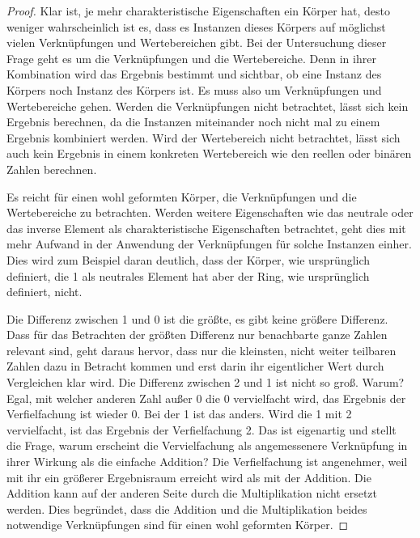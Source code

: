 \documentclass{report}
\numberwithin{equation}{section}
\begin{document}
\begin{proof}
	Klar ist, je mehr charakteristische Eigenschaften ein Körper hat, desto weniger wahrscheinlich ist es, dass es Instanzen dieses Körpers auf möglichst vielen Verknüpfungen und Wertebereichen gibt. Bei der Untersuchung dieser Frage geht es um die Verknüpfungen und die Wertebereiche. Denn in ihrer Kombination wird das Ergebnis bestimmt und sichtbar, ob eine Instanz des Körpers noch Instanz des Körpers ist. Es muss also um Verknüpfungen und Wertebereiche gehen. Werden die Verknüpfungen nicht betrachtet, lässt sich kein Ergebnis berechnen, da die Instanzen miteinander noch nicht mal zu einem Ergebnis kombiniert werden. Wird der Wertebereich nicht betrachtet, lässt sich auch kein Ergebnis in einem konkreten Wertebereich wie den reellen oder binären Zahlen berechnen.

	Es reicht für einen wohl geformten Körper, die Verknüpfungen und die Wertebereiche zu betrachten. Werden weitere Eigenschaften wie das neutrale oder das inverse Element als charakteristische Eigenschaften betrachtet, geht dies mit mehr Aufwand in der Anwendung der Verknüpfungen für solche Instanzen einher. Dies wird zum Beispiel daran deutlich, dass der Körper, wie ursprünglich definiert, die 1 als neutrales Element hat aber der Ring, wie ursprünglich definiert, nicht.
	
	Die Differenz zwischen 1 und 0 ist die größte, es gibt keine größere Differenz. Dass für das Betrachten der größten Differenz nur benachbarte ganze Zahlen relevant sind, geht daraus hervor, dass nur die kleinsten, nicht weiter teilbaren Zahlen dazu in Betracht kommen und erst darin ihr eigentlicher Wert durch Vergleichen klar wird. Die Differenz zwischen 2 und 1 ist nicht so groß. Warum? Egal, mit welcher anderen Zahl außer 0 die 0 vervielfacht wird, das Ergebnis der Verfielfachung ist wieder 0. Bei der 1 ist das anders. Wird die 1 mit 2 vervielfacht, ist das Ergebnis der Verfielfachung 2. Das ist eigenartig und stellt die Frage, warum erscheint die Vervielfachung als angemessenere Verknüpfung in ihrer Wirkung als die einfache Addition? Die Verfielfachung ist angenehmer, weil mit ihr ein größerer Ergebnisraum erreicht wird als mit der Addition. Die Addition kann auf der anderen Seite durch die Multiplikation nicht ersetzt werden. Dies begründet, dass die Addition und die Multiplikation beides notwendige Verknüpfungen sind für einen wohl geformten Körper.
\end{proof}
\end{document}
